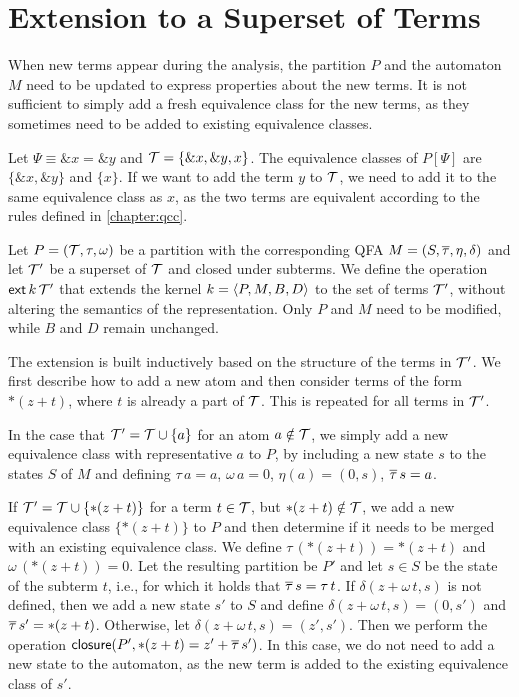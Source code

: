 \section{Extension to a Superset of Terms}

When new terms appear during the analysis, the partition $P$ and the automaton $M$ need to be updated to express properties about the new terms.
It is not sufficient to simply add a fresh equivalence class for the new terms, as they sometimes need to be added to existing equivalence classes.

\begin{example}
    Let $\Psi \equiv \&x = \&y$ and $\T = \{\&x, \&y, x\}$.
    The equivalence classes of $P[\Psi]$ are $\{\&x, \&y\}$ and $\{x\}$.
    If we want to add the term $y$ to $\T$, we need to add it to the same equivalence class as $x$, as the two terms are equivalent according to the rules defined in \cref{chapter:qcc}.
\end{example}

Let $P = (\T, \tau, \omega)$ be a partition with the corresponding QFA $M = (S, \otau, \eta, \delta)$ and let $\T'$ be a superset of $\T$ and closed under subterms.
We define the operation $\ext{k}{\T'}$ that extends the kernel $k = \angl{P, M, B, D}$ to the set of terms $\T'$, without altering the semantics of the representation.
Only $P$ and $M$ need to be modified, while $B$ and $D$ remain unchanged.

The extension is built inductively based on the structure of the terms in $\T'$.
We first describe how to add a new atom and then consider terms of the form $*(z+t)$, where $t$ is already a part of $\T$.
This is repeated for all terms in $\T'$.

In the case that $\T' = \T \cup \{a\}$ for an atom $a \notin \T$, we simply add a new equivalence class with representative $a$ to $P$, by including a new state $s$ to the states $S$ of $M$ and defining $\tau\,a = a$, $\omega\,a=0$, $\eta(a) = (0,s)$, $\otau\,s = a$.

If $\T' = \T \cup \{*(z+t)\}$ for a term $t \in \T$, but $*(z + t) \notin \T$, we add a new equivalence class $\{*(z+t)\}$ to $P$ and then determine if it needs to be merged with an existing equivalence class.
We define $\tau\,(*(z+t)) = *(z+t)$ and $\omega\,(*(z+t))=0$.
Let the resulting partition be $P'$ and let $s \in S$ be the state of the subterm $t$, i.e., for which it holds that $\otau\,s = \tau\,t$.
If $\delta(z + \omega\,t,s)$ is not defined, then we add a new state $s'$ to $S$ and define $\delta(z + \omega\,t, s) = (0, s')$ and $\otau\,s' = *(z+t)$.
Otherwise, let $\delta(z + \omega\,t, s) = (z', s')$.
Then we perform the operation $\closure{*(z + t)}{z'}{\otau\,s'}{P'}$.
In this case, we do not need to add a new state to the automaton,
as the new term is added to the existing equivalence class of $s'$.
